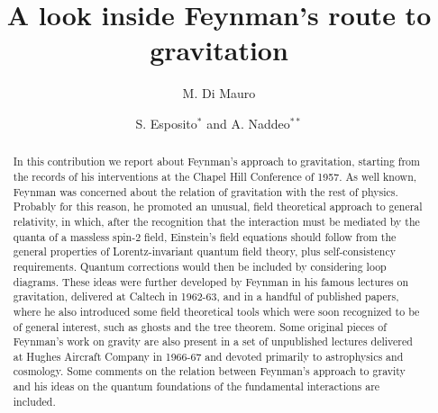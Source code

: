 \documentclass{ws-procs961x669}            %
\begin{document}
\title{A look inside Feynman's route to gravitation}

\author{M. Di Mauro}

\address{Dipartimento di Matematica, Universit\`a di Salerno,
Via Giovanni Paolo II,\\
Fisciano (SA), 84084, Italy\\
E-mail: madimauro@unisa.it}


\author{S. Esposito$^*$ and A. Naddeo$^{**}$}

\address{INFN, Sezione di Napoli, C. U. Monte S. Angelo, Via Cinthia,\\
Napoli, 80125, Italy\\
$^*$E-mail: sesposit@na.infn.it\\
$^{**}$E-mail: anaddeo@na.infn.it}



\begin{abstract}
In this contribution we report about Feynman's approach to
gravitation, starting from the records of his interventions at the
Chapel Hill Conference of 1957. As well known, Feynman was
concerned about the relation of gravitation with the rest of
physics. Probably for this reason, he promoted an unusual, field
theoretical approach to general relativity, in which, after the
recognition that the interaction must be mediated by the quanta of
a massless spin-$2$ field, Einstein's field equations should
follow from the general properties of Lorentz-invariant quantum
field theory, plus self-consistency requirements. Quantum
corrections would then be included by considering loop diagrams.
These ideas were further developed by Feynman in his famous
lectures on gravitation, delivered at Caltech in 1962-63, and in a
handful of published papers, where he also introduced some field
theoretical tools which were soon recognized to be of general
interest, such as ghosts and the tree theorem. Some original
pieces of Feynman's work on gravity are also present in a set of
unpublished lectures delivered at Hughes Aircraft Company in
1966-67 and devoted primarily to astrophysics and cosmology. Some
comments on the relation between Feynman's approach to gravity and
his ideas on the quantum foundations of the fundamental
interactions are included.
\end{abstract}


\bodymatter
\end{document}
